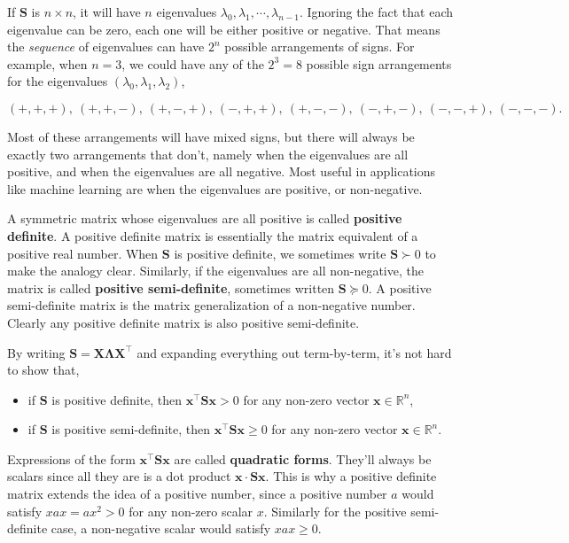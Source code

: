 \documentclass[
  letterpaper,
  DIV=11,
  numbers=noendperiod]{scrreprt}
\providecommand{\tightlist}{%
  \setlength{\itemsep}{0pt}\setlength{\parskip}{0pt}}\usepackage{longtable,booktabs,array}
\begin{document}
If \(\mathbf{S}\) is \(n \times n\), it will have \(n\) eigenvalues
\(\lambda_0, \lambda_1, \cdots, \lambda_{n-1}\). Ignoring the fact that
each eigenvalue can be zero, each one will be either positive or
negative. That means the \emph{sequence} of eigenvalues can have \(2^n\)
possible arrangements of signs. For example, when \(n=3\), we could have
any of the \(2^3=8\) possible sign arrangements for the eigenvalues
\((\lambda_0, \lambda_1, \lambda_2)\),

\[(+, +, +), \ (+, +, -), \ (+, -, +), \ (-, +, +), \ (+, -, -), \ (-, +, -), \ (-, -, +), \ (-, -, -).\]

Most of these arrangements will have mixed signs, but there will always
be exactly two arrangements that don't, namely when the eigenvalues are
all positive, and when the eigenvalues are all negative. Most useful in
applications like machine learning are when the eigenvalues are
positive, or non-negative.

A symmetric matrix whose eigenvalues are all positive is called
\textbf{positive definite}. A positive definite matrix is essentially
the matrix equivalent of a positive real number. When \(\mathbf{S}\) is
positive definite, we sometimes write \(\mathbf{S} \succ 0\) to make the
analogy clear. Similarly, if the eigenvalues are all non-negative, the
matrix is called \textbf{positive semi-definite}, sometimes written
\(\mathbf{S} \succcurlyeq 0\). A positive semi-definite matrix is the
matrix generalization of a non-negative number. Clearly any positive
definite matrix is also positive semi-definite.

By writing \(\mathbf{S}=\mathbf{X \Lambda X}^\top\) and expanding
everything out term-by-term, it's not hard to show that,

\begin{itemize}
\tightlist
\item
  if \(\mathbf{S}\) is positive definite, then
  \(\mathbf{x}^\top \mathbf{S} \mathbf{x} > 0\) for any non-zero vector
  \(\mathbf{x} \in \mathbb{R}^n\),
\item
  if \(\mathbf{S}\) is positive semi-definite, then
  \(\mathbf{x}^\top \mathbf{S} \mathbf{x} \geq 0\) for any non-zero
  vector \(\mathbf{x} \in \mathbb{R}^n\).
\end{itemize}

Expressions of the form \(\mathbf{x}^\top \mathbf{S} \mathbf{x}\) are
called \textbf{quadratic forms}. They'll always be scalars since all
they are is a dot product \(\mathbf{x} \cdot \mathbf{S} \mathbf{x}\).
This is why a positive definite matrix extends the idea of a positive
number, since a positive number \(a\) would satisfy \(xax=ax^2 > 0\) for
any non-zero scalar \(x\). Similarly for the positive semi-definite
case, a non-negative scalar would satisfy \(xax \geq 0\).
\end{document}

